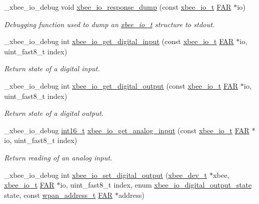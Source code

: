 \begin{DoxyCompactItemize}
\item 
\-\_\-xbee\-\_\-io\-\_\-debug void \hyperlink{group__xbee__io_ga931be802188e7f6d5f34ca8c47405479}{xbee\-\_\-io\-\_\-response\-\_\-dump} (const \hyperlink{structxbee__io__t}{xbee\-\_\-io\-\_\-t} \hyperlink{group__hal_gaef060b3456fdcc093a7210a762d5f2ed}{F\-A\-R} $\ast$io)
\begin{DoxyCompactList}\small\item\em Debugging function used to dump an \hyperlink{structxbee__io__t}{xbee\-\_\-io\-\_\-t} structure to stdout. \end{DoxyCompactList}\item 
\-\_\-xbee\-\_\-io\-\_\-debug int \hyperlink{group__xbee__io_gad542b5112bb7aafb9b3b9f965d6f3703}{xbee\-\_\-io\-\_\-get\-\_\-digital\-\_\-input} (const \hyperlink{structxbee__io__t}{xbee\-\_\-io\-\_\-t} \hyperlink{group__hal_gaef060b3456fdcc093a7210a762d5f2ed}{F\-A\-R} $\ast$io, uint\-\_\-fast8\-\_\-t index)
\begin{DoxyCompactList}\small\item\em Return state of a digital input. \end{DoxyCompactList}\item 
\-\_\-xbee\-\_\-io\-\_\-debug int \hyperlink{group__xbee__io_ga6f3c5c657a49cd87abe13bdba3af15e9}{xbee\-\_\-io\-\_\-get\-\_\-digital\-\_\-output} (const \hyperlink{structxbee__io__t}{xbee\-\_\-io\-\_\-t} \hyperlink{group__hal_gaef060b3456fdcc093a7210a762d5f2ed}{F\-A\-R} $\ast$io, uint\-\_\-fast8\-\_\-t index)
\begin{DoxyCompactList}\small\item\em Return state of a digital output. \end{DoxyCompactList}\item 
\-\_\-xbee\-\_\-io\-\_\-debug \hyperlink{group__hal_ga2140805d08462d474b82ddc8d1c2f3e6}{int16\-\_\-t} \hyperlink{group__xbee__io_ga69fd62a7e8b6ebd3654ba426f8aa07ab}{xbee\-\_\-io\-\_\-get\-\_\-analog\-\_\-input} (const \hyperlink{structxbee__io__t}{xbee\-\_\-io\-\_\-t} \hyperlink{group__hal_gaef060b3456fdcc093a7210a762d5f2ed}{F\-A\-R} $\ast$io, uint\-\_\-fast8\-\_\-t index)
\begin{DoxyCompactList}\small\item\em Return reading of an analog input. \end{DoxyCompactList}\item 
\-\_\-xbee\-\_\-io\-\_\-debug int \hyperlink{group__xbee__io_ga73696df85c4f9e52d5d24825d3a90b2a}{xbee\-\_\-io\-\_\-set\-\_\-digital\-\_\-output} (\hyperlink{structxbee__dev__t}{xbee\-\_\-dev\-\_\-t} $\ast$xbee, \hyperlink{structxbee__io__t}{xbee\-\_\-io\-\_\-t} \hyperlink{group__hal_gaef060b3456fdcc093a7210a762d5f2ed}{F\-A\-R} $\ast$io, uint\-\_\-fast8\-\_\-t index, enum \hyperlink{group__xbee__io_gaf104a10d2bc34550b99de92fe3564cd2}{xbee\-\_\-io\-\_\-digital\-\_\-output\-\_\-state} state, const \hyperlink{structwpan__address__t}{wpan\-\_\-address\-\_\-t} \hyperlink{group__hal_gaef060b3456fdcc093a7210a762d5f2ed}{F\-A\-R} $\ast$address)

\end{DoxyCompactItemize}
